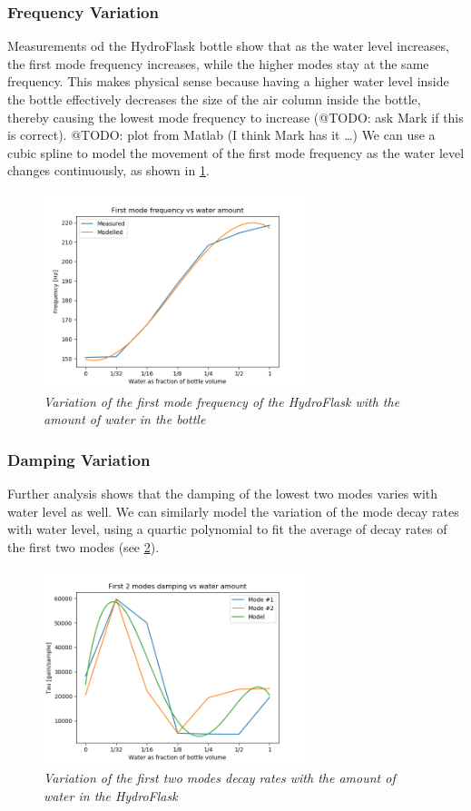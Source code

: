 \documentclass[twoside,a4paper]{article}
\begin{document}
\subsubsection{Frequency Variation} \label{sec:water-freq}
%
Measurements od the HydroFlask bottle show that as the water
level increases, the first mode frequency increases, while the
higher modes stay at the same frequency. This makes physical
sense because having a higher water level inside the bottle
effectively decreases the size of the air column inside the
bottle, thereby causing the lowest mode frequency to increase
(@TODO: ask Mark if this is correct).
\newline\newline
@TODO: plot from Matlab (I think Mark has it \dots)
\newline\newline
We can use a cubic spline to model the movement of the first
mode frequency as the water level changes continuously, as
shown in \cref{fig:water-mode-freq}.
%
\begin{figure}[!htb]
    \centering
    \includegraphics[width=3in]{../Figures/Water_Freq}
    \caption{\it{Variation of the first mode frequency of the HydroFlask
                with the amount of water in the bottle}}
    \label{fig:water-mode-freq}
\end{figure}
%
\subsubsection{Damping Variation} \label{sec:water-damp}
%
Further analysis shows that the damping of the lowest two modes
varies with water level as well. We can similarly model the
variation of the mode decay rates with water level, using a
quartic polynomial to fit the average of decay rates of the first
two modes (see \cref{fig:water-mode-damp}).
%
\begin{figure}[!htb]
    \centering
    \includegraphics[width=3in]{../Figures/Water_Damping}
    \caption{\it{Variation of the first two modes decay rates
                 with the amount of water in the HydroFlask}}
    \label{fig:water-mode-damp}
\end{figure}
%
\end{document}

